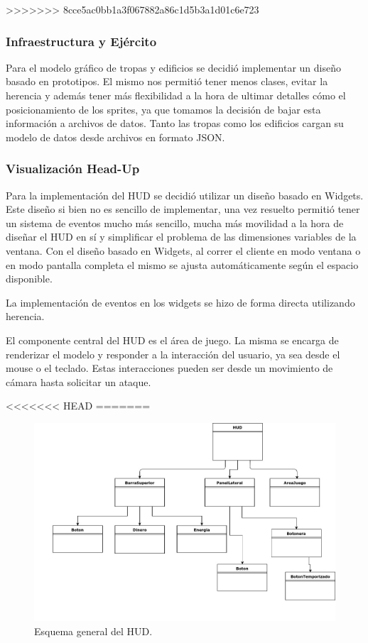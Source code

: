 \documentclass[titlepage,a4paper,12pt]{article}
\begin{document}
>>>>>>> 8cce5ac0bb1a3f067882a86c1d5b3a1d01c6e723
\subsubsection{Infraestructura y Ejército}
Para el modelo gráfico de tropas y edificios se decidió implementar un diseño basado en prototipos. El mismo nos permitió tener menos clases, evitar la herencia y además tener más flexibilidad a la hora de ultimar detalles cómo el posicionamiento de los sprites, ya que tomamos la decisión de bajar esta información a archivos de datos. Tanto las tropas como los edificios cargan su modelo de datos desde archivos en formato JSON.

\subsubsection{Visualización Head-Up}
Para la implementación del HUD se decidió utilizar un diseño basado en Widgets. Este diseño si bien no es sencillo de implementar, una vez resuelto permitió tener un sistema de eventos mucho más sencillo, mucha más movilidad a la hora de diseñar el HUD en sí y simplificar el problema de las dimensiones variables de la ventana. Con el diseño basado en Widgets, al correr el cliente en modo ventana o en modo pantalla completa el mismo se ajusta automáticamente según el espacio disponible.

La implementación de eventos en los widgets se hizo de forma directa utilizando herencia.

El componente central del HUD es el área de juego. La misma se encarga de renderizar el modelo y responder a la interacción del usuario, ya sea desde el mouse o el teclado. Estas interacciones pueden ser desde un movimiento de cámara hasta solicitar un ataque.

<<<<<<< HEAD
=======
\begin{figure}[H]
	\centering
	\includegraphics[width=14cm]{../imagenes/cliente-esquema-HUD.jpg}
	\caption{\label{fig:cliente-esquema-HUD} Esquema general del HUD.}
\end{figure}
\end{document}
